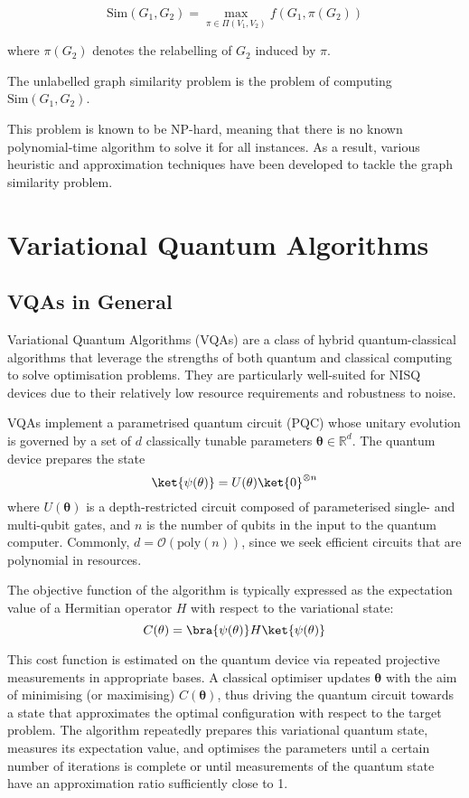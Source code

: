 $$\text{Sim}(G_1,G_2)= \max_{\pi\in\Pi(V_1,V_2)} f(G_1, \pi(G_2))$$

where $\pi(G_2)$ denotes the relabelling of $G_2$ induced by $\pi$.

The unlabelled graph similarity problem is the problem of computing $\text{Sim}(G_1,G_2)$.

This problem is known to be NP-hard, meaning that there is no known polynomial-time algorithm to solve it for all instances. As a result, various heuristic and approximation techniques have been developed to tackle the graph similarity problem.

\section{Variational Quantum Algorithms}
\subsection{VQAs in General}
Variational Quantum Algorithms (VQAs) are a class of hybrid quantum-classical algorithms that leverage the strengths of both quantum and classical computing to solve optimisation problems. They are particularly well-suited for NISQ devices due to their relatively low resource requirements and robustness to noise.

VQAs implement a parametrised quantum circuit (PQC) whose unitary evolution is governed by a set of $d$ classically tunable parameters $\mathbf{\theta}\in\mathbb{R}^d$. The quantum device prepares the state
$$\ket{\psi(\mathbf{\theta})}=U(\mathbf{\theta})\ket{0}^{\otimes n}$$
where $U(\mathbf{\theta})$ is a depth-restricted circuit composed of parameterised single- and multi-qubit gates, and $n$ is the number of qubits in the input to the quantum computer. Commonly, $d=\mathcal{O}(\text{poly}(n))$, since we seek efficient circuits that are polynomial in resources. 

The objective function of the algorithm is typically expressed as the expectation value of a Hermitian operator $H$ with respect to the variational state:
$$C(\mathbf{\theta})= \bra{\psi(\mathbf{\theta})}H\ket{\psi(\mathbf{\theta})} $$

This cost function is estimated on the quantum device via repeated projective measurements in appropriate bases. A classical optimiser updates $\mathbf{\theta}$ with the aim of minimising (or maximising) $C(\mathbf{\theta})$, thus driving the quantum circuit towards a state that approximates the optimal configuration with respect to the target problem. The algorithm repeatedly prepares this variational quantum state, measures its expectation value, and optimises the parameters until a certain number of iterations is complete or until measurements of the quantum state have an approximation ratio sufficiently close to 1.

